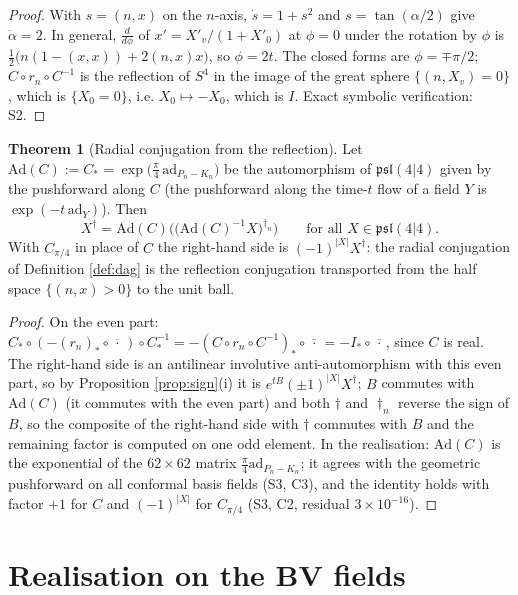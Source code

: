 \documentclass[11pt]{article}
\theoremstyle{definition}
\newtheorem{theorem}[definition]{Theorem}
\begin{document}
\begin{proof}
With $s=(n,x)$ on the $n$-axis, $\dot s=1+s^2$ and $s=\tan(\alpha/2)$ give $\dot\alpha=2$. In general, $\frac{d}{d\phi}$ of $x'=X'_v/(1+X'_0)$ at $\phi=0$ under the rotation by $\phi$ is $\frac12\big(n(1-(x,x))+2(n,x)x\big)$, so $\phi=2t$. The closed forms are $\phi=\mp\pi/2$; $C\circ r_n\circ C^{-1}$ is the reflection of $S^4$ in the image of the great sphere $\{(n,X_v)=0\}$, which is $\{X_0=0\}$, i.e. $X_0\mapsto-X_0$, which is $I$. Exact symbolic verification: S2.
\end{proof}

\begin{theorem}[Radial conjugation from the reflection]
\label{thm:CdagC}
Let $\mathrm{Ad}(C):=C_*=\exp\big(\tfrac\pi4\,\mathrm{ad}_{P_n-K_n}\big)$ be the automorphism of $\mathfrak{psl}(4|4)$ given by the pushforward along $C$ (the pushforward along the time-$t$ flow of a field $Y$ is $\exp(-t\,\mathrm{ad}_Y)$). Then
\[
X^\dagger=\mathrm{Ad}(C)\Big(\big(\mathrm{Ad}(C)^{-1}X\big)^{\dagger_n}\Big)\qquad\text{for all }X\in\mathfrak{psl}(4|4).
\]
With $C_{\pi/4}$ in place of $C$ the right-hand side is $(-1)^{|X|}X^\dagger$: the radial conjugation of Definition \ref{def:dag} is the reflection conjugation transported from the half space $\{(n,x)>0\}$ to the unit ball.
\end{theorem}

\begin{proof}
On the even part: $C_*\circ(-(r_n)_*\circ\overline{\,\cdot\,})\circ C_*^{-1}=-(C\circ r_n\circ C^{-1})_*\circ\overline{\,\cdot\,}=-I_*\circ\overline{\,\cdot\,}$, since $C$ is real. The right-hand side is an antilinear involutive anti-automorphism with this even part, so by Proposition \ref{prop:sign}(i) it is $e^{tB}(\pm1)^{|X|}X^\dagger$; $B$ commutes with $\mathrm{Ad}(C)$ (it commutes with the even part) and both $\dagger$ and $\dagger_n$ reverse the sign of $B$, so the composite of the right-hand side with $\dagger$ commutes with $B$ and the remaining factor is computed on one odd element. In the realisation: $\mathrm{Ad}(C)$ is the exponential of the $62\times62$ matrix $\frac\pi4\mathrm{ad}_{P_n-K_n}$; it agrees with the geometric pushforward on all conformal basis fields (S3, C3), and the identity holds with factor $+1$ for $C$ and $(-1)^{|X|}$ for $C_{\pi/4}$ (S3, C2, residual $3\times10^{-16}$).
\end{proof}

\section{Realisation on the BV fields}
\label{sec:fields}
\end{document}
